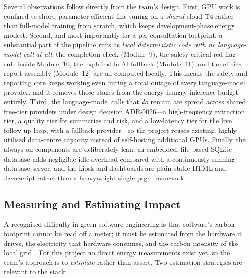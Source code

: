 \documentclass[11pt,a4paper]{article}
\begin{document}
Several observations follow directly from the team's design. First, GPU work is confined
to short, parameter-efficient fine-tuning on a \emph{shared} cloud T4 rather than
full-model training from scratch, which keeps development-phase energy modest. Second,
and most importantly for a per-consultation footprint, a substantial part of the pipeline
runs as \emph{local deterministic code with no language-model call at all}: the
completion check (Module~9), the safety-critical red-flag rule inside Module~10, the
explainable-AI fallback (Module~11), and the clinical-report assembly (Module~12) are all
computed locally. This means the safety and reporting core keeps working even during a
total outage of every language-model provider, and it removes those stages from the
energy-hungry inference budget entirely. Third, the language-model calls that \emph{do}
remain are spread across shared free-tier providers under design decision ADR-0026---a
high-frequency extraction tier, a quality tier for summaries and risk, and a low-latency
tier for the live follow-up loop, with a fallback provider---so the project reuses
existing, highly utilised data-centre capacity instead of self-hosting additional GPUs.
Finally, the always-on components are deliberately lean: an embedded, file-based SQLite
database adds negligible idle overhead compared with a continuously running database
server, and the kiosk and dashboards are plain static HTML and JavaScript rather than a
heavyweight single-page framework.

\subsection{Measuring and Estimating Impact}
A recognised difficulty in green software engineering is that software's carbon footprint
cannot be read off a meter; it must be estimated from the hardware it drives, the
electricity that hardware consumes, and the carbon intensity of the local
grid~\cite{accorinti2022}. For this project no direct energy measurements exist yet, so
the team's approach is to \emph{estimate} rather than assert. Two estimation strategies
are relevant to the stack:
\end{document}
